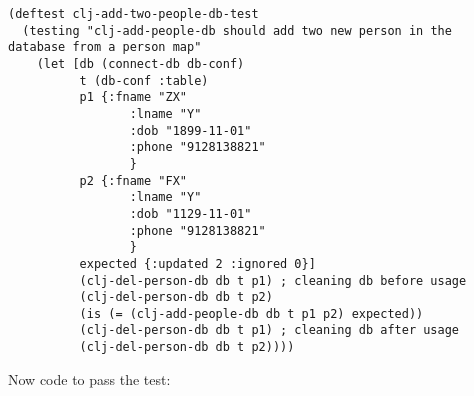\documentclass[11pt]{article}
\begin{document}
\begin{verbatim}
(deftest clj-add-two-people-db-test
  (testing "clj-add-people-db should add two new person in the database from a person map"
    (let [db (connect-db db-conf)
          t (db-conf :table)
          p1 {:fname "ZX"
                 :lname "Y"
                 :dob "1899-11-01"
                 :phone "9128138821"
                 }
          p2 {:fname "FX"
                 :lname "Y"
                 :dob "1129-11-01"
                 :phone "9128138821"
                 }
          expected {:updated 2 :ignored 0}]
          (clj-del-person-db db t p1) ; cleaning db before usage
          (clj-del-person-db db t p2)
          (is (= (clj-add-people-db db t p1 p2) expected))
          (clj-del-person-db db t p1) ; cleaning db after usage
          (clj-del-person-db db t p2))))

\end{verbatim}

Now code to pass the test:
\end{document}
